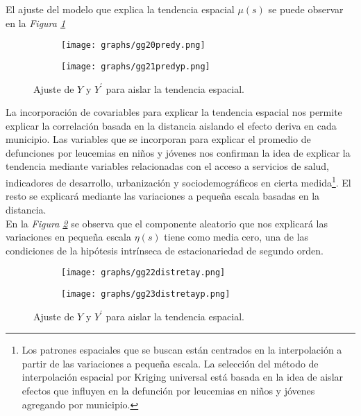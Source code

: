 \documentclass[11pt, oneside]{book}
\begin{document}
El ajuste del modelo que explica la tendencia espacial $\mu(s)$ se puede observar en la \emph{Figura \ref{fig20.ajustemu}} 

  \begin{figure}[ht]
  	\begin{subfigure}{.5\textwidth}
  	  \centering
  	  \texttt{[image: graphs/gg20predy.png]}
  	\end{subfigure}%
  	\begin{subfigure}{.5\textwidth}
  	  \centering
      \texttt{[image: graphs/gg21predyp.png]}
  	\end{subfigure}
    \caption{Ajuste de $Y$ y $Y^{'}$ para aislar la tendencia espacial.}
    \label{fig20.ajustemu}
  \end{figure}

La incorporación de covariables para explicar la tendencia espacial nos permite explicar la correlación basada en la distancia aislando el efecto deriva en cada municipio. Las variables que se incorporan para explicar el promedio de defunciones por leucemias en niños y jóvenes nos confirman la idea de explicar la tendencia  mediante variables relacionadas con el acceso a servicios de salud, indicadores de desarrollo, urbanización y sociodemográficos en cierta medida\footnote{Los patrones espaciales que se buscan están centrados en la interpolación a partir de las variaciones a pequeña escala. La selección del método de interpolación espacial por Kriging universal está basada en la idea de aislar efectos que influyen en la defunción por leucemias en niños y jóvenes agregando por municipio.}. El resto se explicará mediante las variaciones a pequeña escala basadas en la distancia.\\

En la \emph{Figura \ref{fig13.eta}} se observa que el componente aleatorio que nos explicará las variaciones en pequeña escala $\eta(s)$ tiene como media cero, una de las condiciones de la hipótesis intrínseca de estacionariedad de segundo orden.\\ 

  \begin{figure}[!ht]
  	\begin{subfigure}{.5\textwidth}
  	  \centering
  	  \texttt{[image: graphs/gg22distretay.png]}
  	\end{subfigure}%
  	\begin{subfigure}{.5\textwidth}
  	  \centering
      \texttt{[image: graphs/gg23distretayp.png]}
  	\end{subfigure}
    \caption{Ajuste de $Y$ y $Y^{'}$ para aislar la tendencia espacial.}
  \label{fig13.eta}
  \end{figure}
\end{document}
